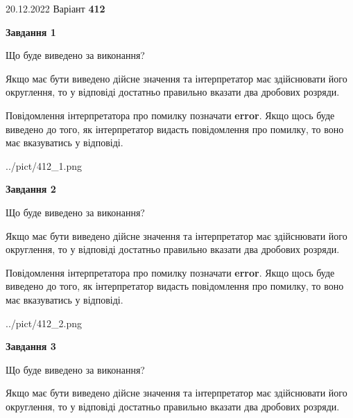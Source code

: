 \documentclass[12pt, ukrainian]{article}
\begin{document}
{20.12.2022 Варіант \No \textbf { 412 }\par}
{
\begin {Large}

{\begin {center}\textbf{Завдання 1}\end {center}}\par
Що буде виведено за виконання? \par

Якщо має бути виведено дійсне значення та інтерпретатор має здійснювати його округлення, 
то у відповіді достатньо правильно вказати два дробових розряди.

Повідомлення інтерпретатора про помилку позначати \textbf{error}.
Якщо щось буде виведено до того, як інтерпретатор видасть повідомлення про помилку, 
то воно має вказуватись у відповіді. \par

\begin{center}
	{../pict/412_1.png}
\end{center}
\newpage

{\begin {center}\textbf{Завдання 2}\end {center}}\par
Що буде виведено за виконання? \par

Якщо має бути виведено дійсне значення та інтерпретатор має здійснювати його округлення, 
то у відповіді достатньо правильно вказати два дробових розряди.

Повідомлення інтерпретатора про помилку позначати \textbf{error}.
Якщо щось буде виведено до того, як інтерпретатор видасть повідомлення про помилку, 
то воно має вказуватись у відповіді. \par

\begin{center}
	{../pict/412_2.png}
\end{center}
\newpage

{\begin {center}\textbf{Завдання 3}\end {center}}\par
Що буде виведено за виконання? \par

Якщо має бути виведено дійсне значення та інтерпретатор має здійснювати його округлення, 
то у відповіді достатньо правильно вказати два дробових розряди.


\end{Large}}
\end{document}
